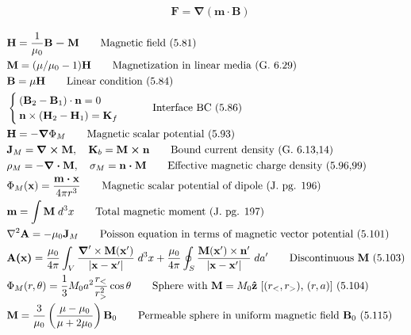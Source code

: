 \documentclass[10pt]{article}
\newcommand{\zhat}{\boldsymbol{\hat{\textbf{z}}}}
\newcommand{\ve}[1]{\boldsymbol{\mathbf{#1}}}
\newcommand{\vect}[1]{\boldsymbol{\mathbf{#1}}}
\begin{document}
\begin{multicols}{2}
\begin{align*}
		& \vect{F} = \vect{\nabla(m \cdot B)} \tag*{Force on dipole (5.69)} \\
	\end{align*}
	\setlength{\abovedisplayskip}{-25pt}
	\setlength{\belowdisplayskip}{0pt}
	\setlength{\abovedisplayshortskip}{0pt}
	\setlength{\belowdisplayshortskip}{0pt}
	\begin{align*} 
		& \vect{H} = \frac{1}{\mu_0} \vect{B - M} \tag*{Magnetic field (5.81)} \\
		& \ve{M} = (\mu / \mu_0 - 1) \ve{H} \tag*{Magnetization in linear media (G. 6.29)} \\
		& \vect{B} = \mu \vect{H} \tag*{Linear condition (5.84)} \\
		&\begin{cases}
			(\vect{B}_2 - \vect{B}_1) \cdot \vect{n} = 0 \\
			\vect{n} \times (\vect{H}_2 - \vect{H}_1) = \vect{K}_f \\ 
		\end{cases} \tag*{Interface BC (5.86)} \\
		& \vect{H} = -\vect{\nabla} \Phi_M \tag*{Magnetic scalar potential (5.93)} \\
		& \vect{J}_M = \vect{\nabla \times M}, \quad \vect{K}_b = \vect{M \times n}  \tag*{Bound current density (G. 6.13,14)} \\
		& \rho_M = - \vect{\nabla \cdot M}, \quad \sigma_M = \vect{n \cdot M} \tag*{Effective magnetic charge density (5.96,99)} \\
		& \Phi_M(\vect{x}) = \frac{\vect{m \cdot x}}{4 \pi r^3} \tag*{Magnetic scalar potential of dipole (J. pg. 196)} \\
		& \ve{m} = \int \ve{M} \; d^3 x \tag*{Total magnetic moment (J. pg. 197)} \\
		& \nabla^2 \vect{A} = -\mu_0 \vect{J}_M \tag*{Poisson equation in terms of magnetic vector potential (5.101)} \\
		& \vect{A(x)} = \frac{\mu_0}{4 \pi} \int_V \frac{\vect{\nabla}' \times \vect{M}(\vect{x}')}{|\vect{x} - \vect{x}'|} \; d^3 x + \frac{\mu_0}{4 \pi} \oint_S \frac{\vect{M}(\vect{x}') \times \vect{n}'}{|\vect{x} - \vect{x}'|} \; da' \tag*{Discontinuous $\ve{M}$ (5.103)}\\
		& \Phi_M(r,\theta) = \frac{1}{3} M_0 a^2 \frac{r_<}{r_>^2} \cos \theta \tag*{Sphere with $\ve{M} = M_0 \zhat$ [$(r_<,r_>)$, $(r,a)$] (5.104)} \\
		& \vect{M} = \frac{3}{\mu_0} \left( \frac{\mu - \mu_0}{\mu + 2 \mu_0} \right) \vect{B}_0 \tag*{Permeable sphere in uniform magnetic field $\ve{B}_0$ (5.115)} \\

\end{align*}
\end{multicols}
\end{document}
